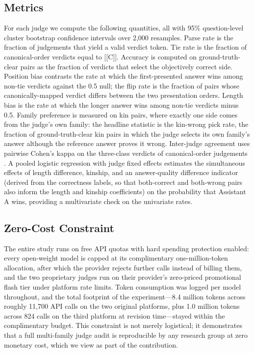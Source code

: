 \documentclass[review,12pt]{elsarticle}
\begin{document}
\subsection{Metrics}
\label{sec:metrics}

For each judge we compute the following quantities, all with 95\%
question-level cluster bootstrap confidence intervals over 2{,}000
resamples. Parse rate is the fraction of judgements that yield a valid
verdict token. Tie rate is the fraction of canonical-order verdicts equal to
[[C]]. Accuracy is computed on ground-truth-clear pairs as the fraction of
verdicts that select the objectively correct side. Position bias contrasts
the rate at which the first-presented answer wins among non-tie verdicts
against the 0.5 null; the flip rate is the fraction of pairs whose
canonically-mapped verdict differs between the two presentation orders.
Length bias is the rate at which the longer answer wins among non-tie
verdicts minus 0.5. Family preference is measured on kin pairs, where
exactly one side comes from the judge's own family: the headline statistic
is the kin-wrong pick rate, the fraction of ground-truth-clear kin pairs in
which the judge selects its own family's answer although the reference
answer proves it wrong. Inter-judge agreement uses pairwise Cohen's kappa on
the three-class verdicts of canonical-order judgements
\citep{cohen1960coefficient}. A pooled logistic regression with judge fixed
effects estimates the simultaneous effects of length difference, kinship,
and an answer-quality difference indicator (derived from the correctness
labels, so that both-correct and both-wrong pairs also inform the length and
kinship coefficients) on the probability that Assistant A wins, providing a
multivariate check on the univariate rates.

\subsection{Zero-Cost Constraint}
\label{sec:free}

The entire study runs on free API quotas with hard spending protection
enabled: every open-weight model is capped at its complimentary
one-million-token allocation, after which the provider rejects further calls
instead of billing them, and the two proprietary judges run on their
provider's zero-priced promotional flash tier under platform rate limits.
Token consumption was logged per model throughout, and the
total footprint of the experiment---8.4 million tokens across roughly
11,700 API calls on the two original platforms, plus 1.0 million tokens
across 824 calls on the third platform at revision time---stayed within
the complimentary budget. This
constraint is not merely logistical; it demonstrates that a full
multi-family judge audit is reproducible by any research group at zero
monetary cost, which we view as part of the contribution.
\end{document}
